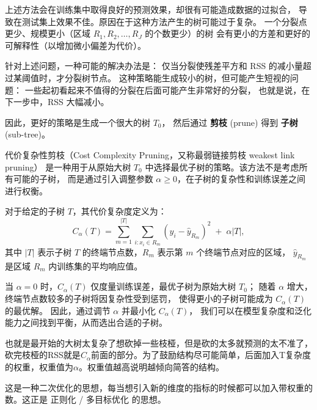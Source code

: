 \begin{proposition}[防止过拟合想要全局最优]
    上述方法会在训练集中取得良好的预测效果，却很有可能造成数据的过拟合，
导致在测试集上效果不佳。原因在于这种方法产生的树可能过于复杂。
一个分裂点更少、规模更小（区域 $R_1, R_2, \dots, R_J$ 的个数更少）的树
会有更小的方差和更好的可解释性（以增加微小偏差为代价）。

针对上述问题，一种可能的解决办法是：
仅当分裂使残差平方和 RSS 的减小量超过某阈值时，才分裂树节点。
这种策略能生成较小的树，但可能产生短视的问题：
一些起初看起来不值得的分裂在后面可能产生非常好的分裂，
也就是说，在下一步中，RSS 大幅减小。

因此，更好的策略是生成一个很大的树 $T_0$，
然后通过 \textbf{剪枝} (prune) 得到 \textbf{子树} (sub-tree)。
\end{proposition}
\begin{definition}[代价复杂性剪枝]
代价复杂性剪枝（Cost Complexity Pruning，又称最弱链接剪枝 weakest link pruning）
是一种用于从原始大树 $T_0$ 中选择最优子树的策略。该方法不是考虑所有可能的子树，
而是通过引入调整参数 $\alpha \geq 0$，在子树的复杂性和训练误差之间进行权衡。

对于给定的子树 $T$，其代价复杂度定义为：
\[
C_\alpha(T) = \sum_{m=1}^{|T|} \sum_{i: x_i \in R_m} (y_i - \hat{y}_{R_m})^2 \;+\; \alpha |T| ,
\]
其中 $|T|$ 表示子树 $T$ 的终端节点数，$R_m$ 表示第 $m$ 个终端节点对应的区域，
$\hat{y}_{R_m}$ 是区域 $R_m$ 内训练集的平均响应值。

当 $\alpha = 0$ 时，$C_\alpha(T)$ 仅度量训练误差，最优子树为原始大树 $T_0$；
随着 $\alpha$ 增大，终端节点数较多的子树将因复杂性受到惩罚，
使得更小的子树可能成为 $C_\alpha(T)$ 的最优解。
因此，通过调节 $\alpha$ 并最小化 $C_\alpha(T)$，
我们可以在模型复杂度和泛化能力之间找到平衡，从而选出合适的子树。
\end{definition}
也就是最开始的大树太复杂了想砍掉一些枝桠，但是砍的太多就预测的太不准了，砍完枝桠的RSS就是$C_{\alpha}$前面的部分。为了鼓励结构尽可能简单，后面加入T复杂度的权重，权重值为$\alpha$。权重值越高说明越倾向简答的结构。
\begin{dxtips}
    这是一种二次优化的思想，每当想引入新的维度的指标的时候都可以加入带权重的数。这正是 正则化 / 多目标优化 的思想。
\end{dxtips}

